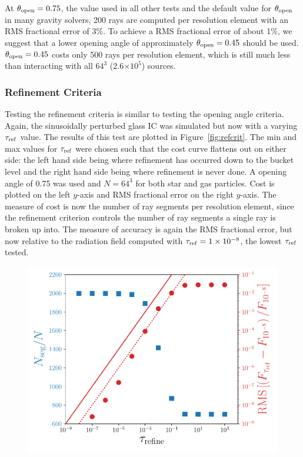 \documentclass[fleq,usenatbib]{mnras}
\providecommand{\e}[1]{\ensuremath{\times10^{#1}}}
\newcommand{\tr}{\tau_{\rm ref}}
\newcommand{\tO}{\theta_{\rm open}}
\begin{document}
{At $\tO=0.75$, the value used in all other tests and the 
default value for $\tO$ in many gravity solvers, 200 rays are 
computed per resolution element with an RMS fractional error of 3\%. To 
achieve a RMS fractional error of about 1\%, we suggest that a lower opening 
angle of approximately $\tO=0.45$ should be used. $\tO=0.45$ costs only 500 
rays per resolution element, which is still much less than interacting with 
all $64^3$ ($2.6\e{5}$) sources.

\subsubsection{Refinement Criteria}
Testing the refinement criteria is similar to testing the opening angle 
criteria. Again, the sinusoidally perturbed glass IC was simulated but now 
with a varying $\tr$ value. The results of this test are plotted in 
Figure~\ref{fig:refcrit}. The min and max values for $\tr$ were chosen such 
that the cost curve flattens out on either side: the left hand side being 
where refinement has occurred down to the bucket level and the right hand side 
being where refinement is never done. A opening angle of 0.75 was used and 
$N=64^3$ for both star and gas particles. Cost is plotted on the left $y$-axis 
and RMS fractional error on the right $y$-axis. The measure of cost is now 
the number of ray segments per resolution element, since the refinement 
criterion controls the number of ray segments a single ray is broken up into. 
The measure of accuracy is again the RMS fractional error, but now relative to 
the radiation field computed with $\tr=1\e{-8}$, the lowest $\tr$ tested.
\begin{figure}
\includegraphics[width=1\linewidth]{Figures/refinement_criteria.pdf}

\end{figure}}
\end{document}
